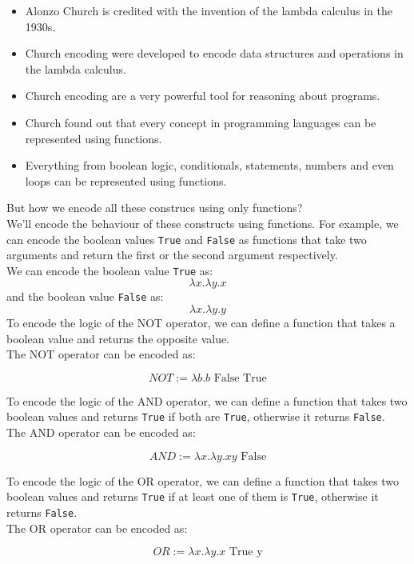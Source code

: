 \documentclass[a4paper]{article}
\begin{document}
\begin{itemize}
    \item Alonzo Church is credited with the invention of the lambda calculus in the 1930s.
    \item Church encoding were developed to encode data structures and operations in the lambda calculus.
    \item Church encoding are a very powerful tool for reasoning about programs.
    \item Church found out that every concept in programming languages can be represented using functions.
    \item Everything from boolean logic, conditionals, statements, numbers and even loops can be represented using functions.
\end{itemize}
But how we encode all these construcs using only functions?\\
We'll encode the behaviour of these constructs using functions. For example, we can encode the boolean values \texttt{True} and \texttt{False} as functions that take two arguments and return the first or the second argument respectively.\\
We can encode the boolean value \texttt{True} as:
\[\lambda x . \lambda y . x\]
and the boolean value \texttt{False} as:
\[\lambda x . \lambda y . y\]
To encode the logic of the NOT operator, we can define a function that takes a boolean value and returns the opposite value.\\
The NOT operator can be encoded as:
\begin{definition}
    \[NOT := \lambda b . b \text{ False True}\]
\end{definition}
\noindent
To encode the logic of the AND operator, we can define a function that takes two boolean values and returns \texttt{True} if both are \texttt{True}, otherwise it returns \texttt{False}.\\
The AND operator can be encoded as:
\begin{definition}
    \[AND := \lambda x . \lambda y . x y \text{ False}\]
\end{definition}
\noindent
To encode the logic of the OR operator, we can define a function that takes two boolean values and returns \texttt{True} if at least one of them is \texttt{True}, otherwise it returns \texttt{False}.\\
The OR operator can be encoded as:
\begin{definition}
    \[OR := \lambda x . \lambda y . x \text{ True y}\]
\end{definition}
\end{document}
